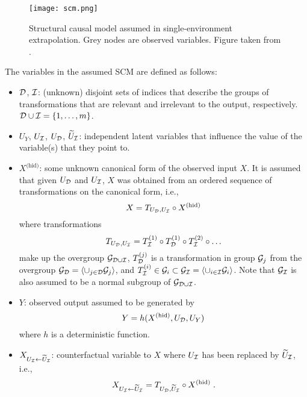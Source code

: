 \begin{figure}[H]
\centering
\texttt{[image: scm.png]}
\caption{Structural causal model assumed in single-environment extrapolation. Grey nodes are observed variables. Figure taken from \parencite{Mouli:2021}.}
\label{fig:scm}
\end{figure}

The variables in the assumed SCM are defined as follows:
\begin{itemize}

\item
$\mathcal{D}$, $\mathcal{I}$: (unknown) disjoint sets of indices that describe the groups of transformations that are relevant and irrelevant to the output, respectively. $\mathcal{D}\cup\mathcal{I}=\{1,\ldots,m\}$.

\item
$U_Y$, $U_{\mathcal{I}}$, $U_{\mathcal{D}}$, $\widetilde{U}_{\mathcal{I}}$: independent latent variables that influence the value of the variable(s) that they point to.

\item
$X^{\text{(hid)}}$: some unknown canonical form of the observed input $X$.  It is assumed that given $U_{\mathcal{D}}$ and $U_{\mathcal{I}}$, $X$ was obtained from an ordered sequence of transformations on the canonical form, i.e.,
\[
X=T_{U_{\mathcal{D}},U_{\mathcal{I}}}\circ X^{\text{(hid)}}
\]
where transformations
\[
T_{U_{\mathcal{D}},U_{\mathcal{I}}}=T_{\mathcal{I}}^{(1)}\circ T_{\mathcal{D}}^{(1)}\circ T_{\mathcal{I}}^{(2)}\circ\ldots
\]
make up the overgroup $\mathcal{G}_{\mathcal{D}\cup\mathcal{I}}$, $T_{\mathcal{D}}^{(j)}$ is a transformation in group $\mathcal{G}_j$ from the overgroup $\mathcal{G}_{\mathcal{D}}=\langle\cup_{j\in\mathcal{D}}\mathcal{G}_j\rangle$, and $T_{\mathcal{I}}^{(i)}\in\mathcal{G}_i\subset\mathcal{G}_{\mathcal{I}}=\langle\cup_{i\in\mathcal{I}}\mathcal{G}_i\rangle$. Note that $\mathcal{G}_{\mathcal{I}}$ is also assumed to be a normal subgroup of $\mathcal{G}_{\mathcal{D}\cup\mathcal{I}}$.

\item
$Y$: observed output assumed to be generated by
\[
Y = h(X^{\text{(hid)}},U_{\mathcal{D}},U_Y)
\]
where $h$ is a deterministic function.

\item
$X_{U_{\mathcal{I}}\leftarrow\widetilde{U}_{\mathcal{I}}}$: counterfactual variable to $X$ where $U_{\mathcal{I}}$ has been replaced by $\widetilde{U}_{\mathcal{I}}$, i.e.,
\[
X_{U_{\mathcal{I}}\leftarrow\widetilde{U}_{\mathcal{I}}} = T_{U_{\mathcal{D}},\widetilde{U}_{\mathcal{I}}}\circ X^{\text{(hid)}} \;.
\]

\end{itemize}

